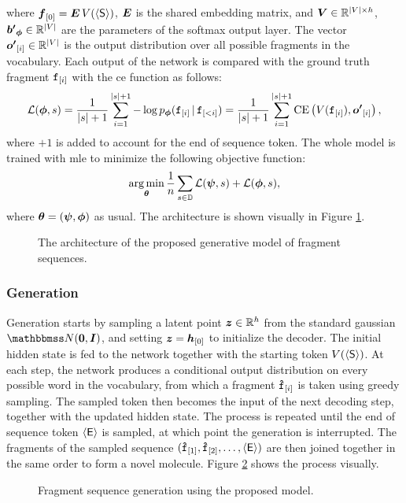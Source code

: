 where $\Elem{f}{0} = \Matrix{e}\,V(\SOS)$, $\Matrix{E}$ is the shared embedding matrix, and $\Matrix{V} \in \Real^{|V| \times h}$, $\Vector{b'}_{\DecParam} \in \Real^{|V|}$ are the parameters of the softmax output layer. The vector $\Elem{o'}{i} \in \Real^{|V|}$ is the output distribution over all possible fragments in the vocabulary. Each output of the network is compared with the ground truth fragment $\mathtt{f}_{[i]}$ with the \gls{ce} function as follows:
$$\Loss(\DecParam, s) = \frac{1}{|s| + 1} \sum_{i=1}^{|s|+1} -\log p_{\DecParam}(\Graph{f}_{[i]} \given \Graph{f}_{[<i]}) = \frac{1}{|s| + 1} \sum_{i=1}^{|s|+1} \Fun{CE}\Par{V(\Graph{f}_{[i]}), \Elem{o'}{i}},$$
where $+1$ is added to account for the end of sequence token. The whole model is trained with \gls{mle} to minimize the following objective function:
$$\argmin_{\Param} \frac{1}{n} \sum_{s \in \Data} \Loss(\EncParam, s) + \Loss(\DecParam, s),$$
where $\boldsymbol{\theta} = (\boldsymbol{\psi}, \boldsymbol{\phi})$ as usual. The architecture is shown visually in Figure \ref{fig:fragment-model-training}.

\begin{figure}[h!]
    \centering
    \resizebox{.99\textwidth}{!}{}
    \caption{The architecture of the proposed generative model of fragment sequences.}
    \label{fig:fragment-model-training}
\end{figure}

\subsubsection*{Generation}
Generation starts by sampling a latent point $\Vector{z} \in \Real^h$ from the standard gaussian $\Normal{\Zeros}{\Matrix{I}}$,
and setting $\Vector{z} = \Elem{h}{0}$ to initialize the decoder. The initial hidden state is fed to the network together with the starting token $V(\mathsf{\langle S \rangle})$. At each step, the network produces a conditional output distribution on every possible word in the vocabulary, from which a fragment $\mathtt{\hat{f}}_{[i]}$ is taken using greedy sampling. The sampled token then becomes the input of the next decoding step, together with the updated hidden state. The process is repeated until the end of sequence token $\mathsf{\langle E \rangle}$ is sampled, at which point the generation is interrupted. The fragments of the sampled sequence $(\mathtt{\hat{f}}_{[1]},\mathtt{\hat{f}}_{[2]}, \ldots, \mathsf{\langle E \rangle})$ are then joined together in the same order to form a novel molecule. Figure \ref{fig:fragment-model-sampling} shows the process visually.
\begin{figure}[h!]
    \centering
    \resizebox{.55\textwidth}{!}{}
    \caption{Fragment sequence generation using the proposed model.}
    \label{fig:fragment-model-sampling}
\end{figure}

